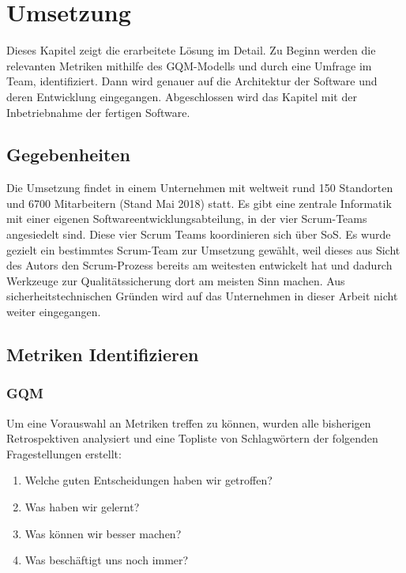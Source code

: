 \chapter{Umsetzung}

Dieses Kapitel zeigt die erarbeitete Lösung im Detail.
Zu Beginn werden die relevanten Metriken mithilfe des \ac{GQM}-Modells und durch eine Umfrage im Team, identifiziert.
Dann wird genauer auf die Architektur der Software und deren Entwicklung einge\-gang\-en.
Abgeschlossen wird das Kapitel mit der Inbetriebnahme der fertigen Software.

\section{Gegebenheiten}

Die Umsetzung findet in einem Unternehmen mit weltweit rund 150 Standorten und 6700 Mitarbeitern (Stand Mai 2018) statt.
Es gibt eine zentrale Informatik mit einer eigenen Softwareentwicklungsabteilung, in der vier Scrum-Teams angesiedelt sind.
Diese vier Scrum Teams koordinieren sich über \ac{SoS}.
Es wurde gezielt ein bestimmtes Scrum-Team zur Umsetzung gewählt, weil dieses aus Sicht des Autors den Scrum-Prozess bereits am weitesten entwickelt hat und dadurch Werkzeuge zur Qualitätssicherung dort am meisten Sinn machen.
Aus sicherheitstechnischen Gründen wird auf das Unternehmen in dieser Arbeit nicht weiter eingegangen.

\section{Metriken Identifizieren}

\subsection{\ac{GQM}}

Um eine Vorauswahl an Metriken treffen zu können, wurden alle bisherigen Retrospektiven analysiert und eine Topliste von Schlagwörtern der folgenden Fragestellungen erstellt:
\begin{enumerate}
    \item Welche guten Entscheidungen haben wir getroffen?
    \item Was haben wir gelernt?
    \item Was können wir besser machen?
    \item Was beschäftigt uns noch immer?
\end{enumerate}

